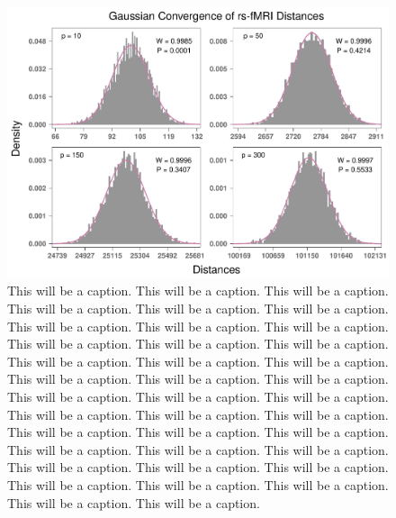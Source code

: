 \documentclass[10pt,letterpaper]{article}\usepackage[]{graphicx}\usepackage[]{color}
\begin{document}
\begin{figure}[H]
	\includegraphics[width=\textwidth]{central_limit_hist_rs-fMRI_standard.pdf}
	\caption{This will be a caption. This will be a caption. This will be a caption. This will be a caption. This will be a caption. This will be a caption. This will be a caption. This will be a caption. This will be a caption. This will be a caption. This will be a caption. This will be a caption. This will be a caption. This will be a caption. This will be a caption. This will be a caption. This will be a caption. This will be a caption. This will be a caption. This will be a caption. This will be a caption. This will be a caption. This will be a caption. This will be a caption. This will be a caption. This will be a caption. This will be a caption. This will be a caption. This will be a caption. This will be a caption. This will be a caption. This will be a caption. This will be a caption. This will be a caption. This will be a caption. This will be a caption. This will be a caption. This will be a caption.}
\end{figure}
\end{document}
